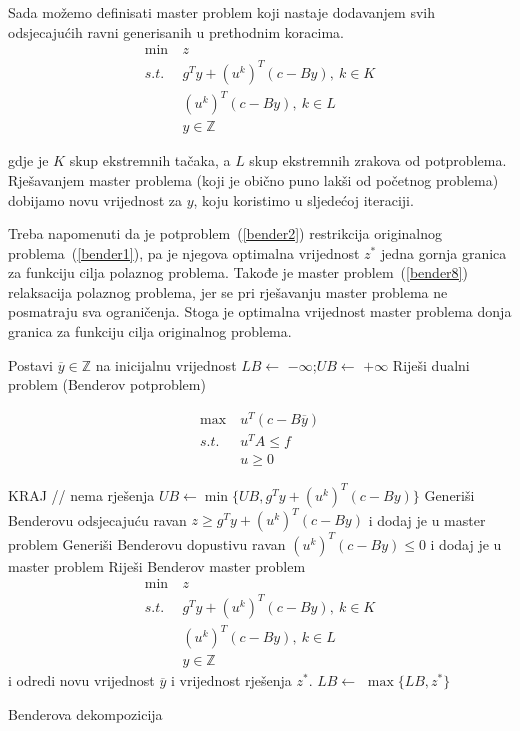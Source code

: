 \documentclass[a4paper, utf8, 11pt, colorlinks]{book}
\begin{document}
Sada možemo definisati master problem koji nastaje dodavanjem svih odsjecajućih ravni generisanih u prethodnim koracima.
  \begin{equation}
	\begin{aligned}\label{bender8}
		\min\ &z\\
		s.t.\ & g^Ty+(u^k)^T(c-By), \ k \in K\\
		& (u^k)^T(c-By), \ k \in L\\
		&y \in \mathbb{Z}
	\end{aligned}
\end{equation}
 
 gdje je $K$ skup ekstremnih tačaka, a $L$ skup ekstremnih zrakova od potproblema. Rješavanjem master problema (koji je obično puno lakši od početnog problema) dobijamo novu vrijednost za $y$, koju koristimo u sljedećoj iteraciji.
 
 Treba napomenuti da je potproblem~(\ref{bender2}) restrikcija originalnog problema~(\ref{bender1}), pa je njegova optimalna vrijednost $z^*$ jedna gornja granica za funkciju cilja polaznog problema. Takođe je master problem~(\ref{bender8}) relaksacija polaznog problema, jer se pri rješavanju master problema ne posmatraju sva ograničenja. Stoga je optimalna vrijednost master problema donja granica za funkciju cilja originalnog problema.
 

 
 
 \begin{algorithm}[!ht] \label{alg:bender}
 	\begin{algorithmic}[1] 
 		\STATE Postavi $\overline{y}\in\mathbb{Z}$ na inicijalnu vrijednost
 		\STATE 	$LB \gets$ $-\infty$;$UB \gets$ $+\infty$
 		\STATE Riješi dualni problem (Benderov potproblem)
 		
 		$$	\begin{aligned}
 			\max\ &u^T (c-B\overline{y})\\
 			s.t.\ &u^TA\leqslant f\\
 			&u\geqslant 0
 			\end{aligned}$$
 		
 		\STATE  KRAJ // nema  rješenja  
 		\ENDIF
 		\STATE $UB \gets \min\{UB,g^Ty+(u^k)^T(c-By)\}$
 		\STATE Generiši Benderovu odsjecajuću ravan $z\geqslant g^Ty+(u^k)^T(c-By)$ i dodaj je u master problem
 		\ENDIF
		\STATE Generiši Benderovu dopustivu ravan 	$(u^k)^T(c-By)\leqslant 0$ i dodaj je u master problem
		\ENDIF
		\STATE Riješi Benderov master problem
			$$\begin{aligned}
			\min\ &z\\
			s.t.\ & g^Ty+(u^k)^T(c-By), \ k \in K\\
			& (u^k)^T(c-By), \ k \in L\\
			&y \in \mathbb{Z}
		\end{aligned}$$
			i odredi novu vrijednost $\overline{y}$ i vrijednost rješenja $z^*$.
		\STATE $LB \gets$ $\max\{LB,z^*\}$
 		\ENDWHILE
 	\end{algorithmic}
 	\caption{Benderova dekompozicija}\label{alg:bender}
 \end{algorithm}
\end{document}

